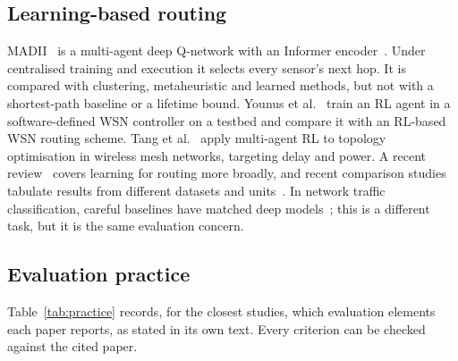 \subsection{Learning-based routing}
MADII~\cite{yang2025madii} is a multi-agent deep Q-network with an Informer encoder~\cite{zhou2021informer}. Under centralised training and execution it selects every sensor's next hop. It is compared with clustering, metaheuristic and learned methods, but not with a shortest-path baseline or a lifetime bound. Younus et al.~\cite{younus2021sdwsn} train an RL agent in a software-defined WSN controller on a testbed and compare it with an RL-based WSN routing scheme. Tang et al.~\cite{tang2025twotier} apply multi-agent RL to topology optimisation in wireless mesh networks, targeting delay and power. A recent review~\cite{learning4routing2025} covers learning for routing more broadly, and recent comparison studies tabulate results from different datasets and units~\cite{icmcsi2026}. In network traffic classification, careful baselines have matched deep models~\cite{simplemodel2025}; this is a different task, but it is the same evaluation concern.

\subsection{Evaluation practice}
Table~\ref{tab:practice} records, for the closest studies, which evaluation elements each paper reports, as stated in its own text. Every criterion can be checked against the cited paper.

